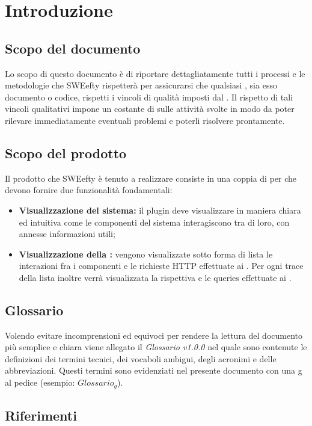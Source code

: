 \section{Introduzione}
	\subsection{Scopo del documento}
	Lo scopo di questo documento è di riportare dettagliatamente tutti i processi e le metodologie che SWEefty rispetterà per assicurarsi che qualsiasi , sia esso documento o codice, rispetti i vincoli di qualità imposti dal .
	Il rispetto di tali vincoli qualitativi impone un costante  di  sulle attività svolte in modo da poter rilevare immediatamente eventuali problemi e poterli risolvere prontamente.
	
	\subsection{Scopo del prodotto}
	Il prodotto che SWEefty è tenuto a realizzare consiste in una coppia di  per  che devono fornire due funzionalità fondamentali:
	\begin{itemize}
		\item \textbf{Visualizzazione  del sistema:} il plugin deve visualizzare in maniera chiara ed intuitiva come le componenti del sistema interagiscono tra di loro, con annesse informazioni utili;
		\item \textbf{Visualizzazione della :} vengono visualizzate sotto forma di lista le interazioni fra i componenti e le richieste HTTP effettuate ai . Per ogni trace della lista inoltre verrà visualizzata la rispettiva  e le queries effettuate ai .
	\end{itemize}

	\subsection{Glossario}
	Volendo evitare incomprensioni  ed equivoci per rendere la lettura del documento più semplice e chiara viene allegato il \emph{Glossario v1.0.0} nel quale sono contenute le definizioni dei termini tecnici, dei vocaboli ambigui, degli acronimi e delle abbreviazioni. Questi termini sono evidenziati nel presente documento con una g al pedice (esempio: $Glossario_{g}$).
	\subsection{Riferimenti}
